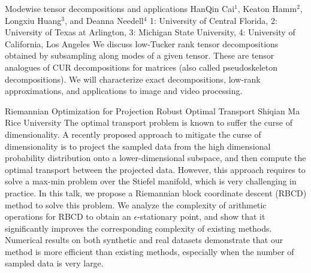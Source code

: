 \begin{addmargin}[2em]{0em}
\vspace{1.5ex}
\abs
{Modewise tensor decompositions and applications}
{HanQin Cai$^{1}$, Keaton Hamm$^{2}$, Longxiu Huang$^{3}$, and Deanna Needell$^{4}$}
{1: University of Central Florida, 2: University of Texas at Arlington, 3: Michigan State University, 4: University of California, Los Angeles}
{We discuss low-Tucker rank tensor decompositions obtained by subsampling along modes of a given tensor. These are tensor analogues of CUR decompositions for matrices (also called pseudoskeleton decompositions). We will characterize exact decompositions, low-rank approximations, and applications to image and video processing.}


\vspace{1.5ex}
\abs
{Riemannian Optimization for Projection Robust Optimal Transport}
{Shiqian Ma}
{Rice University}
{The optimal transport problem is known to suffer the curse of dimensionality. A recently proposed approach to mitigate the curse of dimensionality is to project the sampled data from the high dimensional probability distribution onto a lower-dimensional subspace, and then compute the optimal transport between the projected data. However, this approach requires to solve a max-min problem over the Stiefel manifold, which is very challenging in practice. In this talk, we propose a Riemannian block coordinate descent (RBCD) method to solve this problem. We analyze the complexity of arithmetic operations for RBCD to obtain an $\epsilon$-stationary point, and show that it significantly improves the corresponding complexity of existing methods. Numerical results on both synthetic and real datasets demonstrate that our method is more efficient than existing methods, especially when the number of sampled data is very large.}
\end{addmargin}
